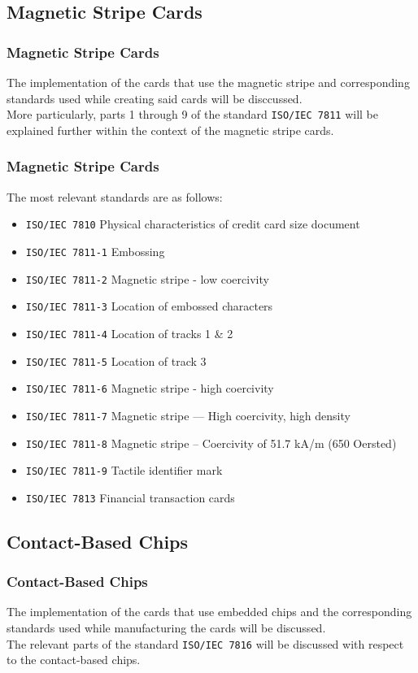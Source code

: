 \documentclass{beamer}
\begin{document}
	\subsection{Magnetic Stripe Cards}
	\begin{frame}
		\frametitle{Magnetic Stripe Cards}
		The implementation of the cards that use the magnetic stripe and corresponding standards used while creating said cards will be disccussed.\\ More particularly, parts 1 through 9 of the standard \texttt{ISO/IEC 7811} will be explained further within the context of the magnetic stripe cards.
	\end{frame}

	\begin{frame}
		\frametitle{Magnetic Stripe Cards}
		The most relevant standards are as follows:
		\begin{itemize}
			\item \texttt{ISO/IEC 7810} Physical characteristics of credit
			card size document
			\item \texttt{ISO/IEC 7811-1} Embossing
			\item \texttt{ISO/IEC 7811-2} Magnetic stripe - low coercivity
			\item \texttt{ISO/IEC 7811-3} Location of embossed characters
			\item \texttt{ISO/IEC 7811-4} Location of tracks 1 \& 2
			\item \texttt{ISO/IEC 7811-5} Location of track 3
			\item \texttt{ISO/IEC 7811-6} Magnetic stripe - high coercivity
			\item \texttt{ISO/IEC 7811-7} Magnetic stripe — High coercivity, high density
			\item \texttt{ISO/IEC 7811-8} Magnetic stripe -- Coercivity of 51.7 kA/m (650 Oersted)
			\item \texttt{ISO/IEC 7811-9} Tactile identifier mark
			\item \texttt{ISO/IEC 7813} Financial transaction cards
		\end{itemize}
	\end{frame}


	\subsection{Contact-Based Chips}
	\begin{frame}
		\frametitle{Contact-Based Chips}
		The implementation of the cards that use embedded chips and the corresponding standards used while manufacturing the cards will be discussed.\\
		The relevant parts of the standard \texttt{ISO/IEC 7816} will be discussed with respect to the contact-based chips.	
	\end{frame}
\end{document}
